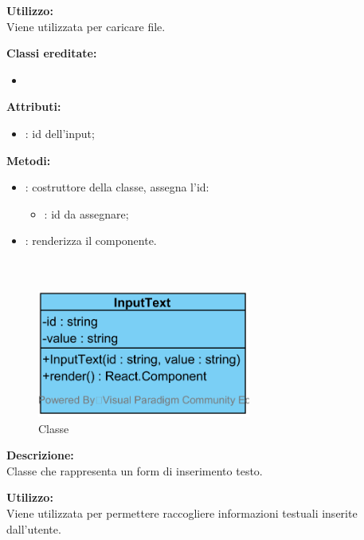 \textbf{Utilizzo:}\\
Viene utilizzata per caricare file.

\textbf{Classi ereditate:}
\begin{itemize}
	\item {}
\end{itemize}


\textbf{Attributi:}
\begin{itemize}
	\item {}: id dell'input;
\end{itemize}

\textbf{Metodi:}
\begin{itemize}
	\item {}: costruttore della classe, assegna l'id:
	\begin{itemize}
		\item {}: id da assegnare;
	\end{itemize}
	\item {}: renderizza il componente.
\end{itemize}

\paragraph[::InputText]{\class}\mbox{}\\ \label{\class}
\begin{figure}[H]
	\centering
	\includegraphics[width=7cm]{./diagrammi/framework/view/gui/inputtext.png}
	\caption{Classe \class}
\end{figure}
\textbf{Descrizione:}\\
Classe che rappresenta un form di inserimento testo.

\textbf{Utilizzo:}\\
Viene utilizzata per permettere raccogliere informazioni testuali inserite dall'utente.

